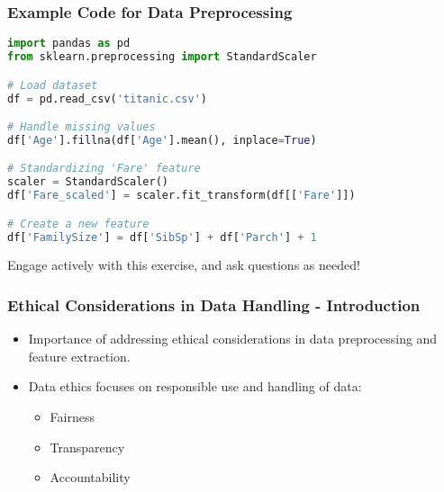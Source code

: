 \documentclass[aspectratio=169]{beamer}
\begin{document}
\begin{frame}[fragile]
    \frametitle{Example Code for Data Preprocessing}
    
    \begin{lstlisting}[language=Python]
import pandas as pd
from sklearn.preprocessing import StandardScaler

# Load dataset
df = pd.read_csv('titanic.csv')

# Handle missing values
df['Age'].fillna(df['Age'].mean(), inplace=True)

# Standardizing 'Fare' feature
scaler = StandardScaler()
df['Fare_scaled'] = scaler.fit_transform(df[['Fare']])

# Create a new feature
df['FamilySize'] = df['SibSp'] + df['Parch'] + 1
    \end{lstlisting}
    
    Engage actively with this exercise, and ask questions as needed!
\end{frame}

\begin{frame}[fragile]
    \frametitle{Ethical Considerations in Data Handling - Introduction}
    \begin{itemize}
        \item Importance of addressing ethical considerations in data preprocessing and feature extraction.
        \item Data ethics focuses on responsible use and handling of data:
            \begin{itemize}
                \item Fairness
                \item Transparency
                \item Accountability
            \end{itemize}
    \end{itemize}
\end{frame}
\end{document}
